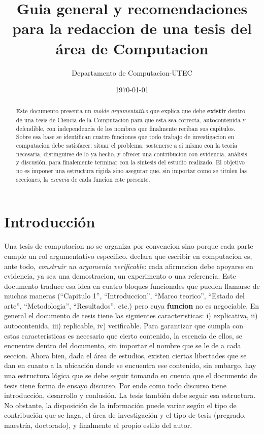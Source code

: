 \documentclass[11pt]{article}
\title{\LARGE\bfseries\color{tituloColor} Guia general y recomendaciones para la redaccion de una tesis  del área de Computacion}
\author{Departamento de Computacion-UTEC\\}
\date{\today}
\begin{document}
\maketitle

\vspace{5cm}

\begin{abstract}
\noindent
Este documento presenta un \emph{molde argumentativo} que
explica que debe \textbf{existir} dentro de una tesis de Ciencia de la
Computacion para que esta sea correcta, autocontenida y defendible, con
independencia de los nombres que finalmente reciban sus capitulos. Sobre 
esa base se identifican cuatro funciones que todo trabajo de investigacion 
en computacion debe satisfacer: situar el problema, sostenerse a si mismo con la teoria
necesaria, distinguirse de lo ya hecho, y ofrecer una contribucion con
evidencia, análisis y discusión, para finalemente terminar con la sintesis del
estudio realizado. El objetivo no es imponer una estructura rigida sino asegurar que, 
sin importar como se titulen las secciones, la \emph{esencia} de cada funcion este presente.
\end{abstract}

\newpage
\tableofcontents
\newpage

\section{Introducción}

Una tesis de computacion no se organiza por convencion sino porque cada parte
cumple un rol argumentativo especifico. \citet{zobel2014writing} declara que escribir en computacion es, ante todo, \emph{construir un argumento
verificable}: cada afirmacion debe apoyarse en evidencia, ya sea una
demostracion, un experimento o una referencia. Este documento traduce esa
idea en cuatro bloques funcionales que pueden llamarse de muchas maneras
(``Capitulo 1'', ``Introduccion'', ``Marco teorico'', ``Estado del arte'',
``Metodologia'', ``Resultados'', etc.) pero cuya \textbf{funcion} no es
negociable. En general el documento de tesis tiene las siguientes caracteristicas: i) explicativa, 
ii) autocontenida, iii) replicable, iv) verificable. Para garantizar que cumpla con estas caracteristicas
es necesario que cierto contenido, la escencia de ellos, se encuentre dentro del documento, sin importar 
el nombre que se le de a cada seccion. Ahora bien, dada el área de estudios, existen ciertas
libertades que se dan en cuanto a la ubicación donde se encuentra ese contenido, sin embargo, 
hay una estructura lógica que se debe seguir tomando en cuenta que el documento de tesis
tiene forma de ensayo discurso. Por ende como todo discurso tiene introducción, desarrollo y conlusión.
La tesis también debe seguir esa estructura. No obstante, la disposición de la información
puede variar según el tipo de contribución que se haga, el área de investigación y el tipo de tesis 
(pregrado, maestría, doctorado), y finalmente el propio estilo del autor. 
\end{document}
